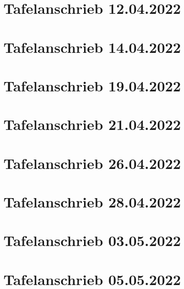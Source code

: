 \documentclass[a4paper,12pt]{article}
\begin{document}
\tableofcontents
\newpage
\section{Tafelanschrieb 12.04.2022}

\newpage
\section{Tafelanschrieb 14.04.2022}

\section{Tafelanschrieb 19.04.2022}

\section{Tafelanschrieb 21.04.2022}

\newpage
\section{Tafelanschrieb 26.04.2022}

\newpage
\section{Tafelanschrieb 28.04.2022}

\newpage
\section{Tafelanschrieb 03.05.2022}

\newpage
\section{Tafelanschrieb 05.05.2022}

\end{document}
